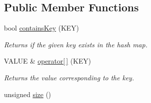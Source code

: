 \subsection*{Public Member Functions}
\begin{DoxyCompactItemize}
\item 
bool \hyperlink{class_hash_map_a7391f737a46c640dde378655e347727f}{contains\+Key} (K\+E\+Y)
\begin{DoxyCompactList}\small\item\em Returns if the given key exists in the hash map. \end{DoxyCompactList}\item 
V\+A\+L\+U\+E \& \hyperlink{class_hash_map_aaf70432c8b6cf09fb8024cd402d1bd7c}{operator\mbox{[}$\,$\mbox{]}} (K\+E\+Y)
\begin{DoxyCompactList}\small\item\em Returns the value corresponding to the key. \end{DoxyCompactList}\item 
\hypertarget{class_hash_map_ae29dc2b5b58f05690e455a51aeb7341d}{}unsigned \hyperlink{class_hash_map_ae29dc2b5b58f05690e455a51aeb7341d}{size} ()\label{class_hash_map_ae29dc2b5b58f05690e455a51aeb7341d}


\end{DoxyCompactItemize}

